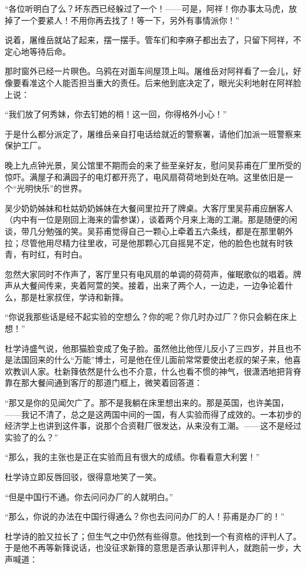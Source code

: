 \par “各位听明白了么？坏东西已经躲过了一个！——可是，阿祥！你办事太马虎，放掉了一个要紧人！不用你再去找了！等一下，另外有事情派你！”
\par 说着，屠维岳就站了起来，摆一摆手。管车们和李麻子都出去了，只留下阿祥，不定心地等待后命。
\par 那时窗外已经一片暝色。乌鸦在对面车间屋顶上叫。屠维岳对阿祥看了一会儿，好像要看准这个人能否担当重大的责任。后来他到底决定了，眼光尖利地射在阿祥脸上说：
\par “我们放了何秀妹，你去钉她的梢！这一回，你得格外小心！”
\par 于是什么都分派定了，屠维岳亲自打电话给就近的警察署，请他们加派一班警察来保护工厂。
\par 晚上九点钟光景，吴公馆里不期而会的来了些至亲好友，慰问吴荪甫在厂里所受的惊吓。满屋子和满园子的电灯都开亮了，电风扇荷荷地到处在响。这里依旧是一个“光明快乐”的世界。
\par 吴少奶奶姊妹和杜姑奶奶姊妹在大餐间里拉开了牌桌。大客厅里吴荪甫应酬客人（内中有一位是刚回上海来的雷参谋），谈着两个月来上海的工潮。那是随便的闲谈，带几分勉强的笑。吴荪甫觉得自己一颗心上牵着五六条线，都是在那里朝外拉；尽管他用尽精力往里收，可是他那颗心兀自摇晃不定，他的脸色也就有时铁青，有时红，有时白。
\par 忽然大家同时不作声了，客厅里只有电风扇的单调的荷荷声，催眠歌似的唱着。牌声从大餐间传来，夹着阿萱的笑。接着，出来了两个人，一边走，一边争论着什么，那是杜家叔侄，学诗和新箨。
\par “你说我那些话是经不起实验的空想么？你的呢？你几时办过厂？你只会躺在床上想！”
\par 杜学诗盛气说，他那猫脸变成了兔子脸。虽然他比他侄儿反小了三四岁，并且也不是法国回来的什么“万能”博士，可是他在侄儿面前常常要使出老叔的架子来，他喜欢教训人家。杜新箨依然是什么也不介意，什么也看不惯的神气，很潇洒地把背脊靠在那大餐间通到客厅的那道门框上，微笑着回答道：
\par “那又是你的见闻欠广了。那不是我躺在床里想出来的。那是英国，也许美国，——我记不清了，总之是这两国中间的一国，有人实验而得了成效的。一本初步的经济学上也讲到这件事，说那个合资鞋厂很发达，从来没有工潮。——这不是经过实验了的么？”
\par “那么，我的主张也是正在实验而且有很大的成绩。你看看意大利罢！”
\par 杜学诗立即反唇回驳，很得意地笑了一笑。
\par “但是中国行不通。你去问问办厂的人就明白。”
\par “那么，你说的办法在中国行得通么？你也去问问办厂的人！荪甫是办厂的！”
\par 杜学诗的脸又拉长了；但生气之中仍然有些得意。他找到一个有资格的评判人了。于是他不再等新箨说话，也没征求新箨的意思是否承认那评判人，就跑前一步，大声喊道：
